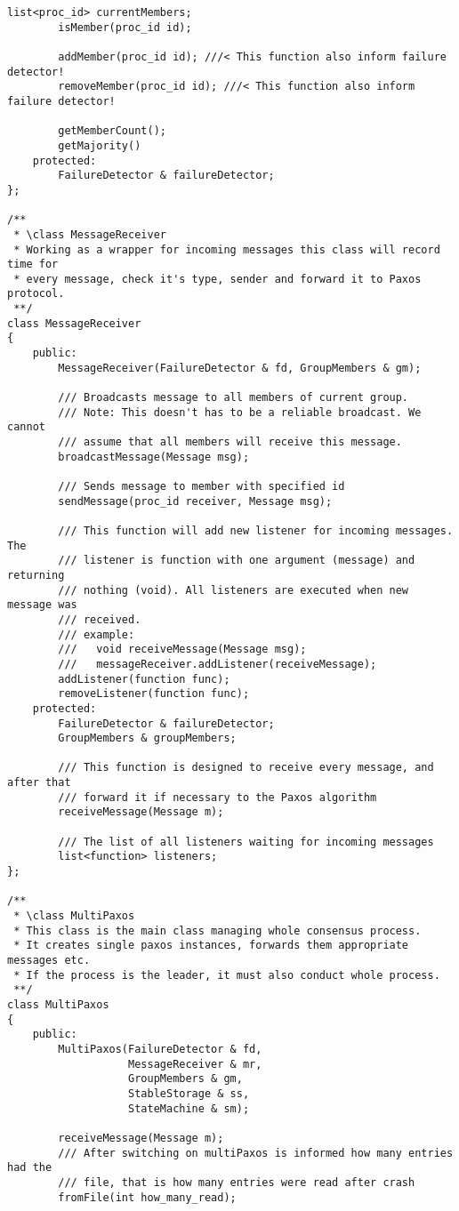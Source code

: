 {\begin{lstlisting}[frame=lines,caption=Pseudocode of Paxos algorithm]
		list<proc_id> currentMembers;
		isMember(proc_id id);

		addMember(proc_id id); ///< This function also inform failure detector!
		removeMember(proc_id id); ///< This function also inform failure detector!

		getMemberCount();
		getMajority()
	protected:
		FailureDetector & failureDetector;
};

/**
 * \class MessageReceiver
 * Working as a wrapper for incoming messages this class will record time for 
 * every message, check it's type, sender and forward it to Paxos protocol.
 **/
class MessageReceiver
{
	public:
		MessageReceiver(FailureDetector & fd, GroupMembers & gm);
		
		/// Broadcasts message to all members of current group.
		/// Note: This doesn't has to be a reliable broadcast. We cannot
		/// assume that all members will receive this message.
		broadcastMessage(Message msg);
		
		/// Sends message to member with specified id
		sendMessage(proc_id receiver, Message msg);
		
		/// This function will add new listener for incoming messages. The 
		/// listener is function with one argument (message) and returning 
		/// nothing (void). All listeners are executed when new message was
		/// received.
		/// example:
		///   void receiveMessage(Message msg);
		///   messageReceiver.addListener(receiveMessage);
		addListener(function func);
		removeListener(function func);
	protected:
		FailureDetector & failureDetector;
		GroupMembers & groupMembers;
	
		/// This function is designed to receive every message, and after that
		/// forward it if necessary to the Paxos algorithm
		receiveMessage(Message m);
		
		/// The list of all listeners waiting for incoming messages
		list<function> listeners;
};

/**
 * \class MultiPaxos
 * This class is the main class managing whole consensus process.
 * It creates single paxos instances, forwards them appropriate messages etc.
 * If the process is the leader, it must also conduct whole process.
 **/
class MultiPaxos
{
	public:
		MultiPaxos(FailureDetector & fd,
				   MessageReceiver & mr,
				   GroupMembers & gm,
				   StableStorage & ss,
				   StateMachine & sm);
	
		receiveMessage(Message m);
		/// After switching on multiPaxos is informed how many entries had the
		/// file, that is how many entries were read after crash
		fromFile(int how_many_read);
		

\end{lstlisting}}
